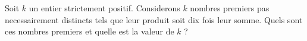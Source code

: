 \documentclass[varwidth]{standalone}
\begin{document}
    Soit $k$ un entier strictement positif. Considerons $k$ nombres premiers pas necessairement distincts tels que leur produit soit dix fois leur somme. Quels sont ces nombres premiers et quelle est la valeur de $k$ ?
\end{document}

